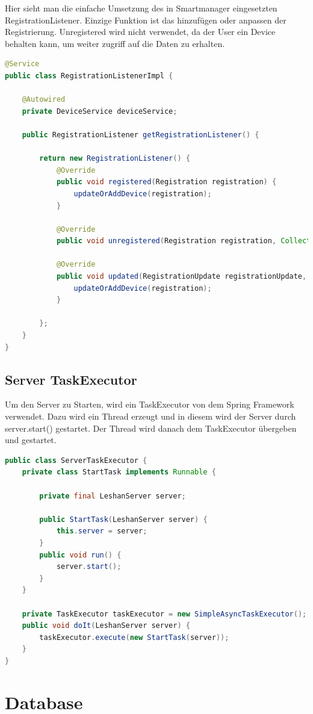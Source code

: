 Hier sieht man die einfache Umsetzung des in Smartmanager eingesetzten RegistrationListener. Einzige Funktion ist das hinzufügen oder anpassen der Registrierung. Unregistered wird nicht verwendet, da der User ein Device behalten kann, um weiter zugriff auf die Daten zu erhalten. 

\begin{lstlisting}[language=java]
@Service
public class RegistrationListenerImpl {

	@Autowired
	private DeviceService deviceService;

	public RegistrationListener getRegistrationListener() {

		return new RegistrationListener() {
			@Override
			public void registered(Registration registration) {
				updateOrAddDevice(registration);
			}

			@Override
			public void unregistered(Registration registration, Collection<Observation> observerColl) {}

			@Override
			public void updated(RegistrationUpdate registrationUpdate, Registration registration) {
				updateOrAddDevice(registration);
			}

		};
	}
}
\end{lstlisting}

\subsection{Server TaskExecutor}
Um den Server zu Starten, wird ein TaskExecutor von dem Spring Framework verwendet. Dazu wird ein Thread erzeugt und in diesem wird der Server durch server.start() gestartet. Der Thread wird danach dem TaskExecutor übergeben und gestartet.
\begin{lstlisting}[language=java]
public class ServerTaskExecutor {
	private class StartTask implements Runnable {

		private final LeshanServer server;

		public StartTask(LeshanServer server) {
			this.server = server;
		}
		public void run() {
			server.start();
		}
	}

	private TaskExecutor taskExecutor = new SimpleAsyncTaskExecutor();
	public void doIt(LeshanServer server) {
		taskExecutor.execute(new StartTask(server));
	}
}
\end{lstlisting}

\newpage

\section{Database}
